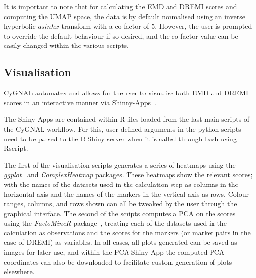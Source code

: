 It is important to note that for calculating the EMD and DREMI scores and computing the UMAP space, the data is by default normalised using an inverse hyperbolic \(asinh x\) transform with a co-factor of \(5\). However, the user is prompted to override the default behaviour if so desired, and the co-factor value can be easily changed within the various scripts.

\subsection{Visualisation}

CyGNAL  automates and allows for the user to visualise both EMD and DREMI scores in an interactive manner via Shinny-Apps~\cite{noauthor_rstudioshiny_2021}. 

The Shiny-Apps are contained within R files loaded from the last main scripts of the CyGNAL workflow. For this, user defined arguments in the python scripts need to be parsed to the R Shiny server when it is called through bash using Rscript.

The first of the visualisation scripts generates a series of heatmaps using the \emph{ggplot}~\cite{wickham_ggplot2_2009} and \emph{ComplexHeatmap} \cite{gu_complexheatmap_2021} packages. These heatmaps show the relevant scores; with the names of the datasets used in the calculation step as columns in the horizontal axis and the names of the markers in the vertical axis as rows. Colour ranges, columns, and rows shown can all be tweaked by the user through the graphical interface. 
The second of the scripts computes a PCA on the scores using the \emph{FactoMineR} package~\cite{le_factominer_2008}, treating each of the datasets used in the calculation as observations and the scores for the markers (or marker pairs in the case of DREMI) as variables. In all cases, all plots generated can be saved as images for later use, and within the PCA Shiny-App the computed PCA coordinates can also be downloaded to facilitate custom generation of plots elsewhere.


